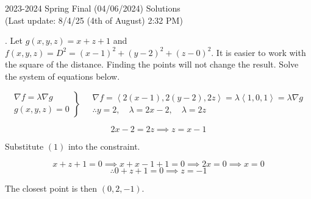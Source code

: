 \documentclass{article}
\begin{document}
\newpage

\begin{center}
2023-2024 Spring Final (04/06/2024) Solutions\\
(Last update: 8/4/25 (4th of August) 2:32 PM)
\end{center}

. Let $g(x,y,z)=x+z+1$ and $f(x,y,z)=D^2=(x-1)^2+(y-2)^2+(z-0)^2$. It is easier to work with the square of the distance. Finding the points will not change the result. Solve the system of equations below.

\[
\left.
\begin{array}{l}
\displaystyle\nabla f=\lambda\nabla g \\
\displaystyle g(x,y,z)=0
\end{array}
\right\}\quad
\begin{array}{l}
\nabla f=\left\langle2(x-1),2(y-2),2z\right\rangle=\lambda\left\langle1,0,1\right\rangle=\lambda\nabla g\\\therefore y=2, \quad\lambda=2x-2,\quad\lambda=2z
\end{array}
\]

\begin{equation}2x-2=2z\implies z=x-1\end{equation}

\hfill

\noindent Substitute $(1)$ into the constraint.

\[x+z+1=0\implies x+x-1+1=0\implies2x=0\implies x=0\]
\[\therefore 0+z+1=0\implies z=-1\]

\hfill

\noindent The closest point is then $\boxed{(0,2,-1)}$.

\hfill
\end{document}
